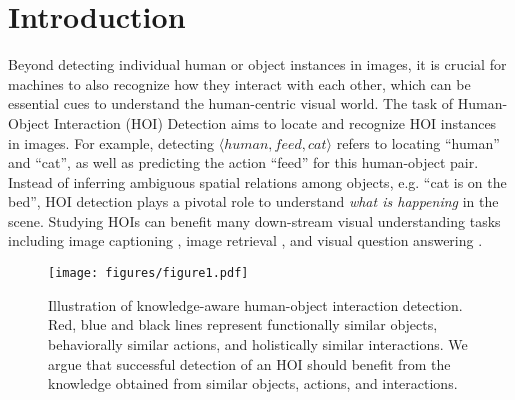 \documentclass[sigconf,screen]{acmart}
\begin{document}


\maketitle

\section{Introduction}

Beyond detecting individual human or object instances in images, it is crucial for machines to also recognize how they interact with each other, which can be essential cues to understand the human-centric visual world. The task of Human-Object Interaction (HOI) Detection aims to locate and recognize HOI instances in images. For example, detecting $\langle human, feed, cat \rangle$ refers to locating ``human'' and ``cat'', as well as predicting the action ``feed'' for this human-object pair. Instead of inferring ambiguous spatial relations among objects, e.g. ``cat is on the bed'', HOI detection plays a pivotal role to understand \textit{what is happening} in the scene. Studying HOIs can benefit many down-stream visual understanding tasks including image captioning \cite{li2017scene}, image retrieval \cite{xu2017scene}, and visual question answering \cite{goyal2017making}.

\begin{figure}
\centering
\texttt{[image: figures/figure1.pdf]}
\caption{Illustration of knowledge-aware human-object interaction detection. Red, blue and black lines represent functionally similar objects, behaviorally similar actions, and holistically similar interactions. We argue that successful detection of an HOI should benefit from the knowledge obtained from similar objects, actions, and interactions.}
\label{fig1}
\end{figure}
\end{document}
